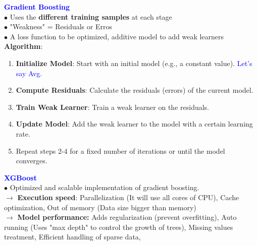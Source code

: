 \documentclass[letterpaper, 10.5pt,landscape]{article}
\begin{document}
\begin{multicols*}{3}
\vspace{3pt}
\textcolor{blue}{\textbf{Gradient Boosting}} \\
$\bullet$ Uses the \textbf{different training samples} at each stage \\
$\bullet$ "Weakness" =  Residuals or Erros \\
$\bullet$ A loss function to be optimized, additive model to add weak learners\\
\textbf{Algorithm}:
\vspace{-3pt}
\begin{enumerate}
    \item \textbf{Initialize Model}: Start with an initial model (e.g., a constant value). \textcolor{blue}{Let's say Avg.}
    \vspace{-3pt}
    \item \textbf{Compute Residuals}: Calculate the residuals (errors) of the current model.
    \vspace{-3pt}
    \item \textbf{Train Weak Learner}: Train a weak learner on the residuals.
    \vspace{-3pt}
    \item \textbf{Update Model}: Add the weak learner to the model with a certain learning rate.
    \vspace{-3pt}
    \item Repeat steps 2-4 for a fixed number of iterations or until the model converges.
\end{enumerate}


\vspace{3pt}
\textcolor{blue}{\textbf{XGBoost}} \\
$\bullet$ Optimized and scalable implementation of gradient boosting. \\
$\rightarrow$ \textbf{Execution speed}: Parallelization (It will use all cores of CPU), Cache optimization, Out of memory (Data size bigger than memory) \\

$\rightarrow$ \textbf{Model performance: } Adds regularization (prevent overfitting), Auto running (Uses "max depth" to control the growth of trees), Missing values treatment, Efficient handling of sparse data, 



\vspace*{\fill}



\columnbreak



\end{multicols*}
\end{document}

